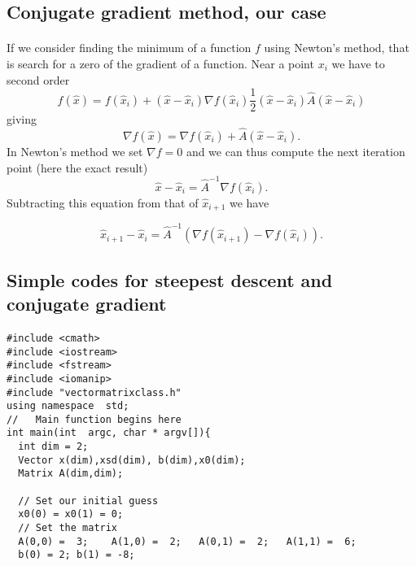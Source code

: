 \documentclass[%
twoside,                 %
final,                   %
10pt]{article}
\begin{document}
\subsection*{Conjugate gradient method, our case}

\paragraph{}
If we consider finding the minimum of a function $f$ using Newton's method,
that is search for a zero of the gradient of a function.  Near a point $x_i$
we have to second order
\begin{equation*}
f(\hat{x})=f(\hat{x}_i)+(\hat{x}-\hat{x}_i)\nabla f(\hat{x}_i)
\frac{1}{2}(\hat{x}-\hat{x}_i)\hat{A}(\hat{x}-\hat{x}_i)
\end{equation*}
giving
\begin{equation*}
\nabla f(\hat{x})=\nabla f(\hat{x}_i)+\hat{A}(\hat{x}-\hat{x}_i).
 \end{equation*}
In Newton's method we set $\nabla f = 0$ and we can thus compute the next iteration point
(here the exact result)
\begin{equation*}
\hat{x}-\hat{x}_i=\hat{A}^{-1}\nabla f(\hat{x}_i).
\end{equation*}
Subtracting this equation from that of $\hat{x}_{i+1}$ we have

\begin{equation*}
\hat{x}_{i+1}-\hat{x}_i=\hat{A}^{-1}(\nabla f(\hat{x}_{i+1})-\nabla f(\hat{x}_i)).
\end{equation*}



\subsection*{Simple codes for  steepest descent and conjugate gradient}

\paragraph{}
\begin{verbatim}
#include <cmath>
#include <iostream>
#include <fstream>
#include <iomanip>
#include "vectormatrixclass.h"
using namespace  std;
//   Main function begins here
int main(int  argc, char * argv[]){
  int dim = 2;
  Vector x(dim),xsd(dim), b(dim),x0(dim);
  Matrix A(dim,dim);
  
  // Set our initial guess
  x0(0) = x0(1) = 0;
  // Set the matrix  
  A(0,0) =  3;    A(1,0) =  2;   A(0,1) =  2;   A(1,1) =  6; 
  b(0) = 2; b(1) = -8;
\end{verbatim}
\end{document}
